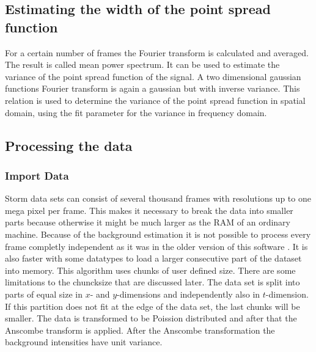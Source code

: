 \subsection{Estimating the width of the point spread function}
For a certain number of frames the Fourier transform is calculated and averaged. The result is called mean power spectrum. It can be used to estimate the variance of the point spread function of the signal. A two dimensional gaussian functions Fourier transform is again a gaussian but with inverse variance. This relation is used to determine the variance of the point spread function in spatial domain, using the fit parameter for the variance in frequency domain.
\subsection{Processing the data}
\subsubsection{Import Data}
Storm data sets can consist of several thousand frames with resolutions up to one mega pixel per frame. This makes it necessary to break the data into smaller parts because otherwise it might be much larger as the RAM of an ordinary machine. Because of the background estimation it is not possible to process every frame completly independent as it was in the older version of this software \cite{MAJoachim}. It is also faster with some datatypes to load a larger consecutive part of the dataset into memory.\newline
This algorithm uses chunks of user defined size. There are some limitations to the chuncksize that are discussed later. The data set is split into parts of equal size in $x$- and $y$-dimensions and independently also in $t$-dimension. If this partition does not fit at the edge of the data set, the last chunks will be smaller.\newline
The data is transformed to be Poission distributed and after that the Anscombe transform is applied. After the Anscombe transformation the background intensities have unit variance.
